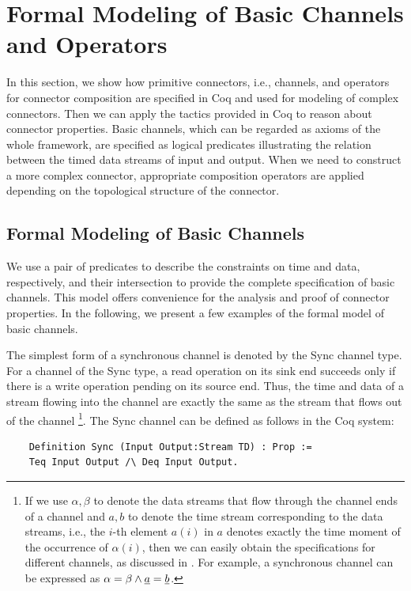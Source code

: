 \documentclass{llncs}
\begin{document}
\section{Formal Modeling of Basic Channels and Operators}\label{sec:channelandoperator}
In this section, we show how primitive connectors, i.e., channels, and operators for connector composition are specified in Coq and used for modeling of complex connectors. Then we can apply the tactics provided in Coq to reason about connector properties. Basic channels, which can be regarded as axioms of the whole framework, are specified as logical predicates illustrating the relation between the timed data streams of input and output. When we need to construct a more complex connector, appropriate composition operators are applied depending on the topological structure of the connector.

\subsection{Formal Modeling of Basic Channels}

We use a pair of predicates to describe the constraints on time and data, respectively, and their intersection to provide the complete specification of basic channels. This model offers convenience for the analysis and proof of connector properties. In the following, we present a few examples of the formal model of basic channels.

The simplest form of a synchronous channel is denoted by the Sync channel type. For a channel of the Sync type, a read operation on
its sink end succeeds only if there is a write operation pending on its source end. Thus, the time and data of a stream flowing
into the channel are exactly the same as the stream that flows out of the channel
\footnote{If we use $\alpha,\beta$ to denote the data streams that flow through the channel ends of a channel and $a,b$ to denote the time stream corresponding to the data streams, i.e., the $i$-th element $a(i)$ in $a$ denotes exactly the time moment of the occurrence of $\alpha(i)$, then we can easily obtain the specifications for different channels, as discussed in \cite{Sun12,SAA+12}. For example, a synchronous channel can be expressed as $\alpha=\beta \wedge \emph{a}=\emph{b}$.}.
The Sync channel can be defined as follows in the Coq system:
\begin{verbatim}
    Definition Sync (Input Output:Stream TD) : Prop :=
    Teq Input Output /\ Deq Input Output.
\end{verbatim}
\end{document}

